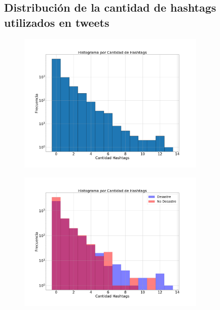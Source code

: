 \documentclass[titlepage,a4paper]{article}
\begin{document}
\subsection{\Large Distribución de la cantidad de hashtags utilizados en tweets}
{\Large
\begin{figure}[H]
 \centering
 \includegraphics[width=0.8\textwidth, height=0.8\textheight, keepaspectratio]{graficos/histograma_precio_cantidad_hashtags_0.png}
\end{figure}
\begin{figure}[H]
 \centering
 \includegraphics[width=0.8\textwidth, height=0.8\textheight, keepaspectratio]{graficos/histograma_precio_cantidad_hashtags_1.png}
\end{figure}
\par}
\end{document}
